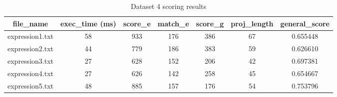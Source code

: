 \documentclass[12pt,a4paper]{article}
\begin{document}
\begin{table}[H]
	\begin{center}
		\caption{Dataset 4 scoring results}
		\begin{tabular}{|c|c|c|c|c|c|c|}
			\hline
			\textbf{file\_name} & \textbf{exec\_time} (ms) & \textbf{score\_e} & \textbf{match\_e} & \textbf{score\_g} & \textbf{proj\_length} & \textbf{general\_score} \\
			\hline\hline
			expression1.txt & 58 & 933 & 176 & 386 & 67 & 0.655448 \\
			\hline
			expression2.txt & 44 & 779 & 186 & 383 & 59 & 0.626610 \\
			\hline
			expression3.txt & 27 & 628 & 152 & 206 & 42 & 0.697381 \\
			\hline
			expression4.txt & 27 & 626 & 142 & 258 & 45 & 0.654667 \\
			\hline
			expression5.txt & 48 & 885 & 157 & 176 & 54 & 0.753796 \\
			\hline
		\end{tabular}
	\end{center}
\end{table}


\pagebreak
\end{document}
